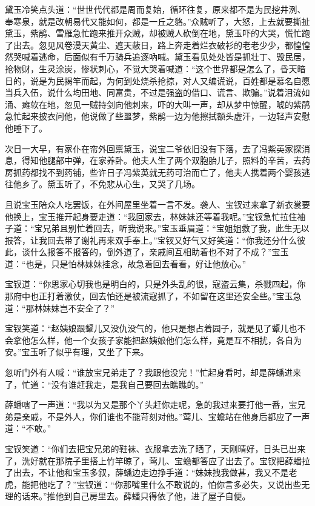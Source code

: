 \documentclass[12pt,oneside]{book}
\begin{document}
黛玉冷笑点头道：“世世代代都是周而复始，循环往复，原来都不是为民挖井洌、奉寒泉，就是改朝易代又能如何，都是一丘之貉。”众贼听了，大怒，上去就要撕扯黛玉，紫鹃、雪雁急忙跑来推开众贼，却被贼人砍倒在地，黛玉吓的大哭，慌忙跑了出去。忽见风卷漫天黄尘、遮天蔽日，路上奔走着烂衣破衫的老老少少，都惶惶然哭喊着逃命，后面似有千万骑兵追逐吶喊。黛玉看见处处皆是抓壮丁、毁民居，抢物财，生灵涂炭，惨状刺心，不觉大哭着喊道：“这个世界都是怎么了，昏天暗日的，说是为民揭竿而起，为何到处烧杀抢掠，对人又编谎说，百姓都是慕名自愿当兵入伍，说什么均田地、同富贵，不过是强盗的借口、谎言、欺骗。”说着泪流如涌、瘫软在地，忽见一贼持剑向他刺来，吓的大叫一声，却从梦中惊醒，唬的紫鹃急忙起来披衣问他，他说做了些噩梦，紫鹃一边为他擦拭额头虚汗，一边轻声安慰他睡下了。

次日一大早，有家仆在帘外回禀黛玉，说宝二爷依旧没有下落，去了冯紫英家探消息，得知他腿部中弹，在家养卧。他夫人生了两个双胞胎儿子，照料的辛苦，去药房抓药都找不到药铺，些许日子冯紫英就无药可治而亡了，他夫人携着两个婴孩逃往他乡了。黛玉听了，不免悲从心生，又哭了几场。

且说宝玉陪众人吃罢饭，在外间屋里坐着一言不发。袭人、宝钗过来拿了新衣裳要他换上，宝玉推开起身要走道：“我回家去，林妹妹还等着我呢。”宝钗急忙拉住袖子道：“宝兄弟且别忙着回去，听我说来。”宝玉垂眉道：“宝姐姐救了我，此生无以报答，让我回去带了谢礼再来双手奉上。”宝钗又好气又好笑道：“你我还分什么彼此，谈什么报答不报答的，倒外道了，亲戚间互相助着也不对了不成？”宝玉道：“也是，只是怕林妹妹挂念，故急着回去看看，好让他放心。”

宝钗道：“你思家心切我也是明白的，只是外头乱的很，寇盗云集，杀戮四起，你那府中也正打着激仗，回去怕还是被流寇抓了，不如留在这里还安全些。”宝玉急道：“那林妹妹岂不安全了？”

宝钗笑道：“赵姨娘跟颦儿又没仇没气的，他只是想占着园子，就是见了颦儿也不会拿他怎么样，他一个女孩子家能把赵姨娘他们怎么样，竟是互不相扰，各自为安。”宝玉听了似乎有理，又坐了下来。

忽听门外有人喊：“谁放宝兄弟走了？我跟他没完！”忙起身看时，却是薛蟠进来了，忙道：“没有谁赶我走，是我自己要回去瞧瞧的。”

薛蟠嗐了一声道：“我以为又是那个丫头赶你走呢，急的我过来要打他一番，宝兄弟是亲戚，不是外人，你们谁也不能苛刻对他。”莺儿、宝蟾站在他身后都应了一声道：“不敢。”

宝钗笑道：“你们去把宝兄弟的鞋袜、衣服拿去洗了晒了，天刚晴好，日头已出来了，洗好就在那院子里搭上竹竿晾了，莺儿、宝蟾都答应了出去了。宝钗把薛蟠拉了出去，不让他和宝玉多叙，薛蟠边走边挣手道：“妹妹拽我做甚，我又不是老虎，能把他吃了？”宝钗道：“你那嘴里什么不敢说的，怕你言多必失，又说出些无理的话来。”推他到自己房里去。薛蟠只得依了他，进了屋子自便。
\end{document}
